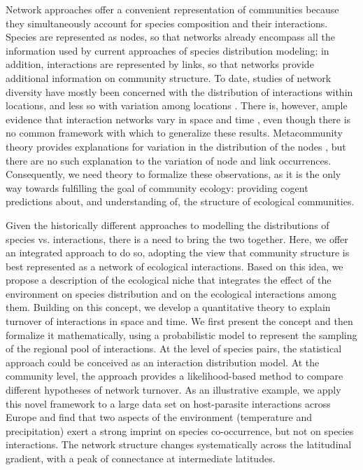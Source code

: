 \documentclass[12pt]{article}
\begin{document}
Network approaches offer a convenient representation of communities because
they simultaneously account for species composition and their interactions.
Species are represented as nodes, so that networks already encompass all the
information used by current approaches of species distribution modeling; in
addition, interactions are represented by links, so that networks provide
additional information on community structure. To date, studies of network
diversity have mostly been concerned with the distribution of interactions
within locations, and less so with variation among locations \citep{Dunne2006,
Bascompte2007, Ings2009, Kefi2012}. There is, however, ample evidence that
interaction networks vary in space and time \citep{Laliberte2010, Poisot2012,
Schleuning2012, Albouy2014, Poisot2016, Trojelsgaard2015}, even though there
is no common framework with which to generalize these results. Metacommunity
theory provides explanations for variation in the distribution of the nodes
\citep{Gravel2011c, Pillai2011,Cazelles2015}, but there are no such explanation
to the variation of node and link occurrences. Consequently, we need theory to
formalize these observations, as it is the only way towards fulfilling the
goal of community ecology: providing cogent predictions about, and
understanding of, the structure of ecological communities.

Given the historically different approaches to modelling the distributions of
species vs. interactions, there is a need to bring the two together. Here, we
offer an integrated approach to do so, adopting the view that community
structure is best represented as a network of ecological interactions. Based
on this idea, we propose a description of the ecological niche that
integrates the effect of the environment on species distribution and on the
ecological interactions among them. Building on this concept, we develop a
quantitative theory to explain turnover of interactions in space and time. We
first present the concept and then formalize it mathematically, using a
probabilistic model to represent the sampling of the regional pool of
interactions. At the level of species pairs, the statistical approach could be
conceived as an interaction distribution model. At the community level, the
approach provides a likelihood-based method to compare different hypotheses of
network turnover. As an illustrative example, we apply this novel framework to
a large data set on host-parasite interactions across Europe and find that two
aspects of the environment (temperature and precipitation) exert a strong
imprint on species co-occurrence, but not on species interactions. The network
structure changes systematically across the latitudinal gradient, with a peak
of connectance at intermediate latitudes.
\end{document}
